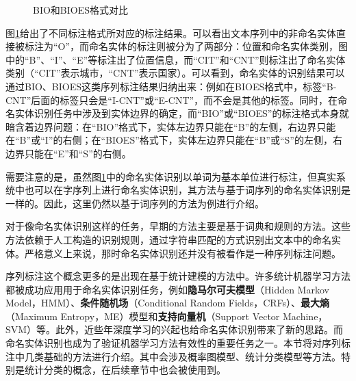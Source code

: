 \begin{figure}[htp]
    \centering
 	\subfigure[BIO格式标注命名实体] { }
 	\subfigure[BIOES格式标注命名实体] {}
	\caption{BIO和BIOES格式对比}
    \label{fig:3.3-1}
\end{figure}
%
\parinterval 图\ref{fig:3.3-1}给出了不同标注格式所对应的标注结果。可以看出文本序列中的非命名实体直接被标注为“O”，而命名实体的标注则被分为了两部分：位置和命名实体类别，图中的“B”、“I”、“E”等标注出了位置信息，而“CIT”和“CNT”则标注出了命名实体类别（“CIT”表示城市，“CNT”表示国家）。可以看到，命名实体的识别结果可以通过BIO、BIOES这类序列标注结果归纳出来：例如在BIOES格式中，标签“B-CNT”后面的标签只会是“I-CNT”或“E-CNT”，而不会是其他的标签。同时，在命名实体识别任务中涉及到实体边界的确定，而“BIO”或“BIOES”的标注格式本身就暗含着边界问题：在“BIO”格式下，实体左边界只能在“B”的左侧，右边界只能在“B”或“I”的右侧；在“BIOES”格式下，实体左边界只能在“B”或“S”的左侧，右边界只能在“E”和“S”的右侧。

\parinterval 需要注意的是，虽然图\ref{fig:3.3-1}中的命名实体识别以单词为基本单位进行标注，但真实系统中也可以在字序列上进行命名实体识别，其方法与基于词序列的命名实体识别是一样的。因此，这里仍然以基于词序列的方法为例进行介绍。

\parinterval 对于像命名实体识别这样的任务，早期的方法主要是基于词典和规则的方法。这些方法依赖于人工构造的识别规则，通过字符串匹配的方式识别出文本中的命名实体。严格意义上来说，那时命名实体识别还并没有被看作是一种序列标注问题。

\parinterval 序列标注这个概念更多的是出现在基于统计建模的方法中。许多统计机器学习方法都被成功应用用于命名实体识别任务，例如{\small\sffamily\bfseries{隐马尔可夫模型}}（Hidden Markov Model，HMM）、{\small\sffamily\bfseries{条件随机场}}（Conditional Random Fields，CRFs）、{\small\sffamily\bfseries{最大熵}}（Maximum Entropy，ME）模型和{\small\sffamily\bfseries{支持向量机}}（Support Vector Machine，SVM）等。此外，近些年深度学习的兴起也给命名实体识别带来了新的思路。而命名实体识别也成为了验证机器学习方法有效性的重要任务之一。本节将对序列标注中几类基础的方法进行介绍。其中会涉及概率图模型、统计分类模型等方法。特别是统计分类的概念，在后续章节中也会被使用到。

